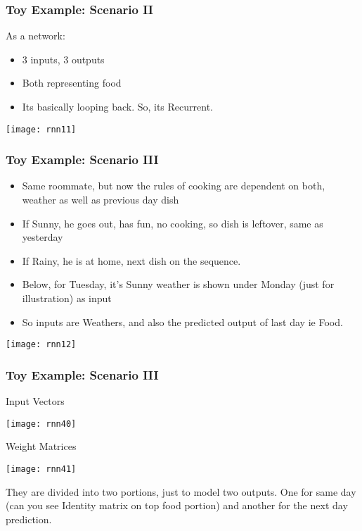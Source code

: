 \begin{frame}[fragile] \frametitle{Toy Example: Scenario II}
As a network:
\begin{itemize}
\item 3 inputs, 3 outputs
\item Both representing food
\item Its basically looping back. So, its Recurrent.
\end{itemize}
\begin{center}
\texttt{[image: rnn11]}
\end{center}
\end{frame}

\begin{frame}[fragile] \frametitle{Toy Example: Scenario III}
\begin{itemize}
\item Same roommate, but now the rules of cooking are dependent on both, weather as well as previous day dish
\item If Sunny, he goes out, has fun, no cooking, so dish is leftover, same as yesterday
\item If Rainy, he is at home, next dish on the sequence.
\item Below, for Tuesday, it's Sunny weather is shown under Monday (just for illustration) as input
\item So inputs are Weathers, and also the predicted output of last day ie Food.
\end{itemize}
\begin{center}
\texttt{[image: rnn12]}
\end{center}
\end{frame}

\begin{frame}[fragile] \frametitle{Toy Example: Scenario III}
Input Vectors
\begin{center}
\texttt{[image: rnn40]}
\end{center}

Weight Matrices
\begin{center}
\texttt{[image: rnn41]}
\end{center}

They are divided into two portions, just to model two outputs. One for same day (can you see Identity matrix on top food portion) and another for the next day prediction.

\end{frame}


